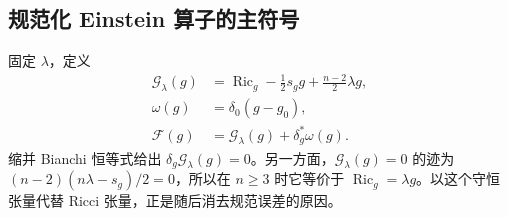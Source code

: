 \subsection{规范化 Einstein 算子的主符号}
\label{g3:subsec:2502:02}
固定 \(\lambda\)，定义
\begin{equation}\label{g3:eq:einstein-conserved-gauge}
	\begin{aligned}
		\mathcal G_\lambda(g)&=\operatorname{Ric}_g-\tfrac12s_g g
			+\tfrac{n-2}{2}\lambda g,\\
		\omega(g)&=\delta_0(g-g_0),\\
		\mathcal F(g)&=\mathcal G_\lambda(g)+\delta_g^*\omega(g).
	\end{aligned}
\end{equation}
缩并 Bianchi 恒等式给出 \(\delta_g\mathcal G_\lambda(g)=0\)。另一方面，\(\mathcal G_\lambda(g)=0\) 的迹为 \((n-2)(n\lambda-s_g)/2=0\)，所以在 \(n\ge3\) 时它等价于 \(\operatorname{Ric}_g=\lambda g\)。以这个守恒张量代替 Ricci 张量，正是随后消去规范误差的原因。


